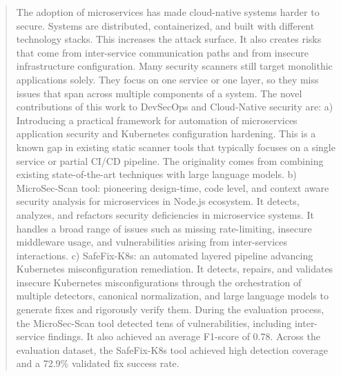 \documentclass[preprint,12pt]{elsarticle}
\newcommand{\new}[1]{#1}
\begin{document}
\begin{frontmatter}
\begin{abstract}
\new{The adoption of microservices has made cloud-native systems harder to secure.} Systems are distributed, containerized, and built with different technology stacks. This increases the attack surface. It also creates risks that come from inter-service communication paths and from insecure infrastructure configuration. Many security scanners still target monolithic applications solely. They focus on one service or one layer, so they miss issues that span across multiple components of a system.
The novel contributions of this work to DevSecOps and Cloud-Native security are: a) Introducing a practical framework for automation of microservices application security and Kubernetes configuration hardening. This is a known gap in existing static scanner tools that typically focuses on a single service or partial CI/CD pipeline. The originality comes from combining existing state-of-the-art techniques with large language models. b) MicroSec-Scan tool: pioneering design-time, code level, and context aware security analysis for microservices in Node.js ecosystem. It detects, analyzes, and refactors security deficiencies in microservice systems. It handles a broad range of issues such as missing rate-limiting, insecure middleware usage, and vulnerabilities arising from inter-services interactions. c) SafeFix-K8s: an automated layered pipeline advancing Kubernetes misconfiguration remediation. It detects, repairs, and validates insecure Kubernetes misconfigurations through the orchestration of multiple detectors, canonical normalization, and large language models to generate fixes and rigorously verify them. During the evaluation process, the MicroSec-Scan tool detected tens of vulnerabilities, including inter-service findings. It also achieved an average F1-score of 0.78. Across the evaluation dataset, the SafeFix-K8s tool achieved high detection coverage and a 72.9\% validated fix success rate. 
\end{abstract}





\begin{graphicalabstract}
\centering
{}
\end{graphicalabstract}
\end{frontmatter}
\end{document}
